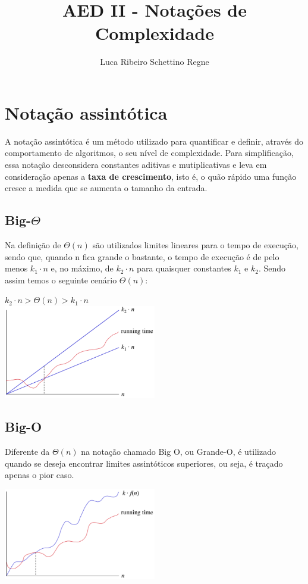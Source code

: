 \documentclass[12pt]{article}
\title{AED II - Notações de Complexidade}
\author{Luca Ribeiro Schettino Regne}
\begin{document}
 

\maketitle

\section{Notação assintótica}
A notação assintótica é um método utilizado para quantificar e definir, através do 
comportamento de algoritmos, o seu nível de complexidade. Para simplificação, essa 
notação desconsidera constantes aditivas e mutiplicativas e leva em consideração 
apenas a \textbf{taxa de crescimento}, isto é, o quão rápido uma função cresce a 
medida que se aumenta o tamanho da entrada.

\subsection{Big-$\Theta$}
Na definição de $\Theta(n)$ são utilizados limites lineares para o tempo de execução, 
sendo que, quando n fica grande o bastante, o tempo de execução é de pelo menos $k_1 \cdot n$
e, no máximo, de $k_{2} \cdot n$ para quaisquer constantes $k_{1}$ e $k_{2}$. Sendo assim 
temos o seguinte cenário $\Theta(n)$:

\begin{center}
    $ k_{2} \cdot n > \Theta(n) > k_{1} \cdot n$\\
    \includegraphics[width=0.5\textwidth]{images/theta_n.png}
\end{center}

\subsection{Big-O}
Diferente da $\Theta(n)$ na notação chamado Big O, ou Grande-O, é utilizado quando se 
deseja encontrar limites assintóticos superiores, ou seja, é traçado apenas o pior caso.

\begin{center}
    \includegraphics[width=0.5\textwidth]{images/bigO_n.png}\\    
\end{center}
\end{document}
